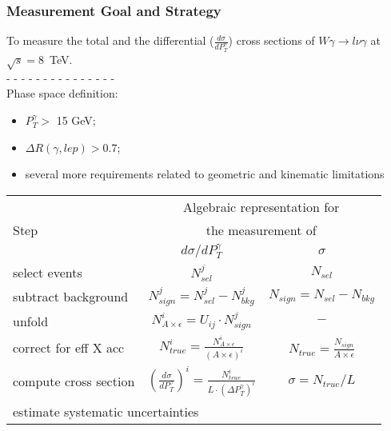 \begin{frame}\frametitle{Measurement Goal and Strategy}
  \scriptsize

  To measure the total and the differential ($\frac{d\sigma}{dP_T^{\gamma}}$) cross sections of $W\gamma\rightarrow l\nu\gamma$ at $\sqrt{s}=$8~TeV.\\
  - - - - - - - - - - - - - - - \\
  Phase space definition:
  \begin{itemize}
    \item $P_T^{\gamma}>$ 15 GeV;
    \item $\Delta{R}(\gamma,lep) > $0.7;
    \item several more requirements related to geometric and kinematic limitations
  \end{itemize}

\begin{table}[h]
  \scriptsize
  \begin{center}
  \begin{tabular}{|l|c|c|}
    \hline
          & \multicolumn{2}{|c|}{Algebraic representation for} \\ 
     Step & \multicolumn{2}{|c|}{the measurement of} \\ 
          & $d\sigma/dP_{T}^{\gamma}$ & $\sigma$ \\ \hline
    select events & {\bfseries{$N_{sel}^j$}} &    {\bfseries{$N_{sel}$}}       \\ \hline
    subtract background & {\bfseries{$N_{sign}^j = N_{sel}^j - N_{bkg}^j$}} &    {\bfseries{$N_{sign}=N_{sel}-N_{bkg}$}}       \\ \hline
    unfold   & $N_{A\times\epsilon}^i = U_{ij} \cdot N_{sign}^j$ &    $-$       \\ \hline
    correct for eff X acc & $N_{true}^i = \frac{N_{A\times\epsilon}^i}{(A \times\epsilon)^i}$ &  $N_{true}=\frac{N_{sign}}{A\times\epsilon}$       \\ \hline
    compute cross section & $ \left( \frac{d\sigma}{dP_{T}^\gamma} \right) ^i = \frac{N_{true}^i}{L \cdot (\Delta P_T^\gamma)^i}$  &  $\sigma = N_{true}/L$       \\ \hline
    \multicolumn{3}{|l|}{estimate systematic uncertainties}          \\ \hline
  \end{tabular}
  \label{tab:analysisOutline}
  \end{center}
\end{table}
\end{frame}%
